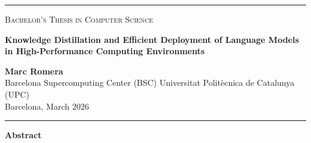\documentclass[11pt, a4paper]{article}
\begin{document}
\pagestyle{empty}


{\color{thesisblue}\rule{\linewidth}{2.4pt}}

\vspace{0.4cm}

\begin{center}
  {\small\color{medgray}\textsc{Bachelor's Thesis in Computer Science}}
\end{center}

\vspace{0.25cm}

\begin{center}
  {\color{thesisblue}
   \fontsize{14.5}{18}\selectfont\bfseries
   Knowledge Distillation and Efficient Deployment of Language Models\\[4pt]
   in High-Performance Computing Environments}
\end{center}

\vspace{0.25cm}

\begin{center}
  {\small\color{darkgray}
    \textbf{Marc Romera}\\[3pt]
    Barcelona Supercomputing Center (BSC) \quad
    Universitat Polit\`ecnica de Catalunya (UPC)\\[3pt]
    Barcelona, March 2026}
\end{center}

\vspace{0.3cm}
{\color{medgray}\rule{\linewidth}{0.5pt}}


\vspace{0.3cm}

\begin{center}
  {\color{thesisblue}\large\bfseries Abstract}
\end{center}

\vspace{0.15cm}
\end{document}
